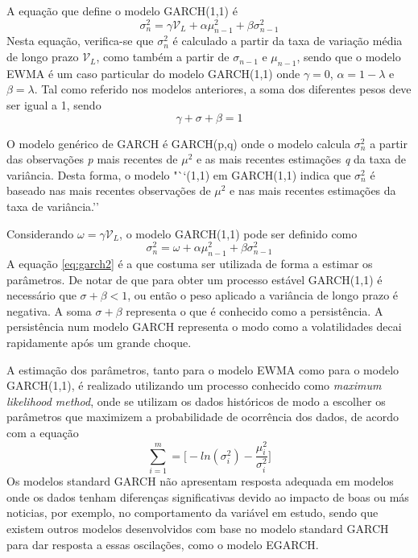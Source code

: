 \documentclass[
  12pt,
  a4paper,
  openany]{book}
\begin{document}
A equação que define o modelo GARCH(1,1) é
\begin{equation} 
  \sigma_{n}^{2} = \gamma\mathcal{V}_{L} + \alpha\mu_{n-1}^{2} + \beta\sigma_{n-1}^{2}
  \label{eq:garch}
\end{equation}
Nesta equação, verifica-se que \(\sigma_{n}^{2}\) é calculado a partir da taxa de variação média de longo prazo \(\mathcal{V}_{L}\), como também a partir de \(\sigma_{n-1}\) e \(\mu_{n-1}\), sendo que o modelo EWMA é um caso particular do modelo GARCH(1,1) onde \(\gamma=0\), \(\alpha=1-\lambda\) e \(\beta=\lambda\). Tal como referido nos modelos anteriores, a soma dos diferentes pesos deve ser igual a 1, sendo \[\gamma+\sigma+\beta=1\]

O modelo genérico de GARCH é GARCH(p,q) onde o modelo calcula \(\sigma_{n}^{2}\) a partir das observações \emph{p} mais recentes de \(\mu^2\) e as mais recentes estimações \emph{q} da taxa de variância. Desta forma, o modelo "``(1,1) em GARCH(1,1) indica que \(\sigma_{n}^{2}\) é baseado nas mais recentes observações de \(\mu^2\) e nas mais recentes estimações da taxa de variância.''\citep[p.227]{Hull2018}

Considerando \(\omega=\gamma\mathcal{V}_{L}\), o modelo GARCH(1,1) pode ser definido como
\begin{equation} 
  \sigma_{n}^{2} = \omega + \alpha\mu_{n-1}^{2} + \beta\sigma_{n-1}^{2}
  \label{eq:garch2}
\end{equation}
A equação \eqref{eq:garch2} é a que costuma ser utilizada de forma a estimar os parâmetros. De notar de que para obter um processo estável GARCH(1,1) é necessário que \(\sigma+\beta<1\), ou então o peso aplicado a variância de longo prazo é negativa. A soma \(\sigma+\beta\) representa o que é conhecido como a persistência. A persistência num modelo GARCH representa o modo como a volatilidades decai rapidamente após um grande choque.

A estimação dos parâmetros, tanto para o modelo EWMA como para o modelo GARCH(1,1), é realizado utilizando um processo conhecido como \emph{maximum likelihood method}, onde se utilizam os dados históricos de modo a escolher os parâmetros que maximizem a probabilidade de ocorrência dos dados, de acordo com a equação
\begin{equation} 
  \sum_{i=1}^{m}=\bigg[-ln(\sigma_{i}^{2})-\frac{\mu_{i}^{2}}{\sigma_{i}^{2}}\bigg]
  \label{eq:mgarch}
\end{equation}
Os modelos standard GARCH não apresentam resposta adequada em modelos onde os dados tenham diferenças significativas devido ao impacto de boas ou más noticias, por exemplo, no comportamento da variável em estudo, sendo que existem outros modelos desenvolvidos com base no modelo standard GARCH para dar resposta a essas oscilações, como o modelo EGARCH.
\end{document}
